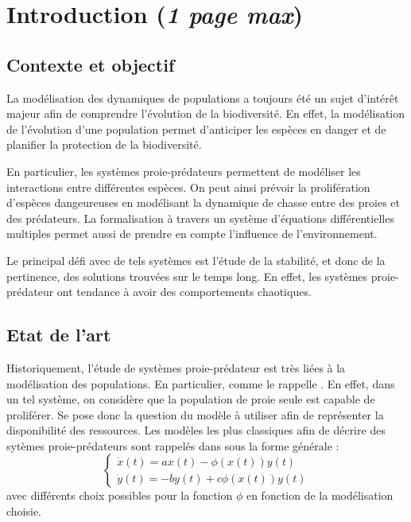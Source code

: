 \chapter{Introduction (\textit{1 page max})}
\label{ch:Introduction}

\section{Contexte et objectif}
\label{sec:Contexte}

La modélisation des dynamiques de populations a toujours été un sujet d'intérêt majeur afin de comprendre l'évolution de la biodiversité. En effet, la modélisation de l'évolution d'une population permet d'anticiper les espèces en danger et de planifier la protection de la biodiversité.

En particulier, les systèmes proie-prédateurs permettent de modéliser les interactions entre différentes espèces. On peut ainsi prévoir la prolifération d'espèces dangeureuses en modélisant la dynamique de chasse entre des proies et des prédateurs. La formalisation à travers un système d'équations différentielles multiples permet aussi de prendre en compte l'influence de l'environnement.

Le principal défi avec de tels systèmes est l'étude de la stabilité, et donc de la pertinence, des solutions trouvées sur le temps long. En effet, les systèmes proie-prédateur ont tendance à avoir des comportements chaotiques.

\section{Etat de l’art}
\label{sec:Etat}

Historiquement, l'étude de systèmes proie-prédateur est très liées à la modélisation des populations. En particulier, comme le rappelle \cite{BrauerBiology}. En effet, dans un tel système, on considère que la population de proie seule est capable de proliférer. Se pose donc la question du modèle à utiliser afin de représenter la disponibilité des ressources.
Les modèles les plus classiques afin de décrire des sytèmes proie-prédateurs sont rappelés dans \cite{Holl2stoch} sous la forme générale :
\begin{equation}
    \begin{cases}
        \dot{x}(t) = a x(t) - \phi (x(t)) y(t) \\
        \dot{y}(t) = -b y(t) + c \phi (x(t)) y(t)
    \end{cases}
\end{equation}
avec différents choix possibles pour la fonction $\phi$ en fonction de la modélisation choisie.

